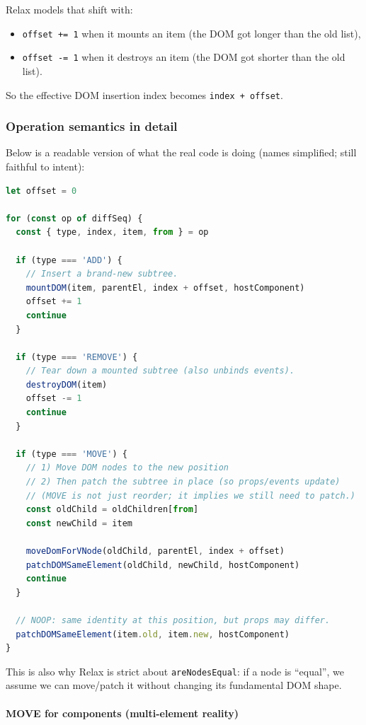 Relax models that shift with:

\begin{itemize}
  \item \texttt{offset += 1} when it mounts an item (the DOM got longer than the old list),
  \item \texttt{offset -= 1} when it destroys an item (the DOM got shorter than the old list).
\end{itemize}

So the effective DOM insertion index becomes \texttt{index + offset}.

\subsubsection*{Operation semantics in detail}

Below is a readable version of what the real code is doing (names simplified; still faithful to intent):

\begin{lstlisting}[language=JavaScript]
let offset = 0

for (const op of diffSeq) {
  const { type, index, item, from } = op

  if (type === 'ADD') {
    // Insert a brand-new subtree.
    mountDOM(item, parentEl, index + offset, hostComponent)
    offset += 1
    continue
  }

  if (type === 'REMOVE') {
    // Tear down a mounted subtree (also unbinds events).
    destroyDOM(item)
    offset -= 1
    continue
  }

  if (type === 'MOVE') {
    // 1) Move DOM nodes to the new position
    // 2) Then patch the subtree in place (so props/events update)
    // (MOVE is not just reorder; it implies we still need to patch.)
    const oldChild = oldChildren[from]
    const newChild = item

    moveDomForVNode(oldChild, parentEl, index + offset)
    patchDOMSameElement(oldChild, newChild, hostComponent)
    continue
  }

  // NOOP: same identity at this position, but props may differ.
  patchDOMSameElement(item.old, item.new, hostComponent)
}
\end{lstlisting}

This is also why Relax is strict about \texttt{areNodesEqual}: if a node is ``equal'', we assume we can move/patch it without changing its fundamental DOM shape.

\paragraph{MOVE for components (multi-element reality)}

